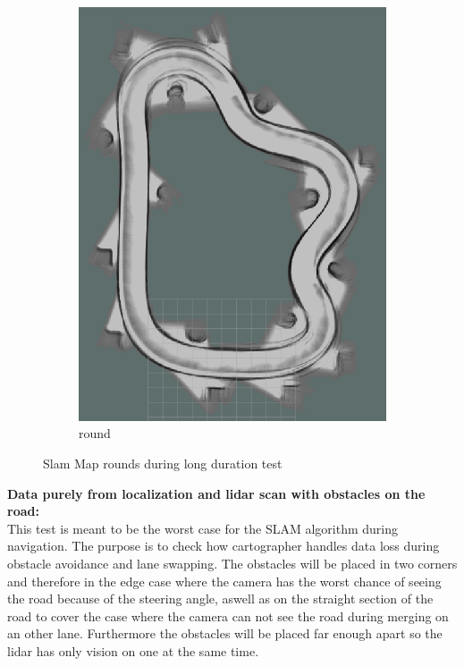 \begin{figure}[H]
\begin{subfigure}{.3\linewidth}
		\includegraphics[width=\textwidth]{Pictures/2slamtest7}
		\caption{ round}
	\end{subfigure}

	\caption{Slam Map rounds during long duration test}
	\label{3slamtest}

\end{figure}


\textbf{Data purely from localization and lidar scan with obstacles on the road:}\\
This test is meant to be the worst case for the SLAM algorithm during navigation. The purpose is to check how cartographer handles data loss during obstacle avoidance and lane swapping.
The obstacles will be placed in two corners and therefore in the edge case where the camera has the worst chance of seeing the road because of the steering angle, aswell as on the straight section of the road to cover the case where the camera can not see the road during merging on an other lane. Furthermore the obstacles will be placed far enough apart so the lidar has only vision on one at the same time.\\

